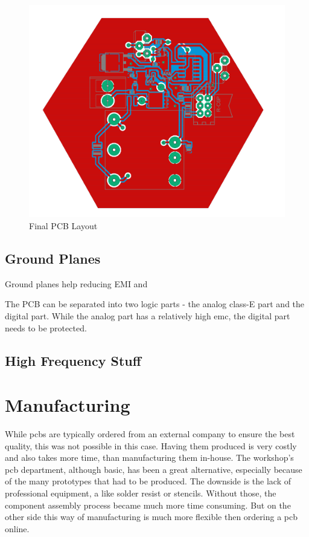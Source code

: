 \begin{figure}[h!]
    \centering
    \includegraphics[width=\textwidth]{kassandra/resources/Tesla6Final.PNG}
    \caption{Final PCB Layout}
    \label{fig:tesla_layout}
\end{figure}

\subsection{Ground Planes}

Ground planes help reducing EMI and

The PCB can be separated into two logic parts - the analog class-E part and the digital part. While the analog part has a relatively high \gls{emc}, the digital part needs to be protected. 

\subsection{High Frequency Stuff}

\section{Manufacturing}

While \glspl{pcb} are typically ordered from an external company to ensure the best quality, this was not possible in this case. Having them produced is very costly and also takes more time, than manufacturing them in-house. The workshop's \gls{pcb} department, although basic, has been a great alternative, especially because of the many prototypes that had to be produced. The downside is the lack of professional equipment, a like solder resist or stencils. Without those, the component assembly process became much more time consuming. But on the other side this way of manufacturing is much more flexible then ordering a \gls{pcb} online.

